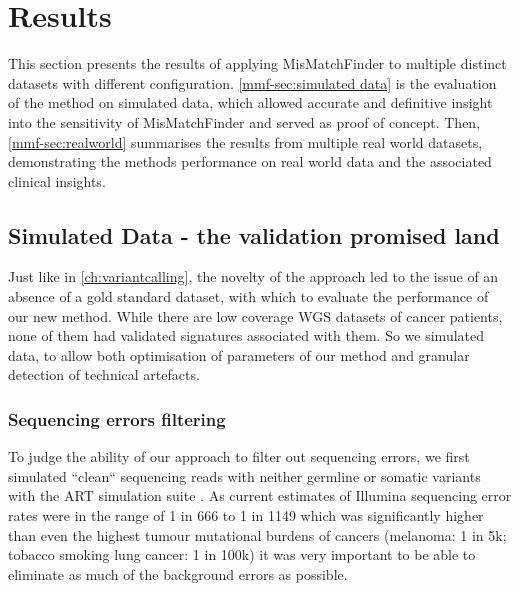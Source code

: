 
\section{Results}
\label{mmf-sec:results}
This section presents the results of applying MisMatchFinder to multiple distinct datasets with different configuration. \autoref{mmf-sec:simulated data} is the evaluation of the method on simulated data, which allowed accurate and definitive insight into the sensitivity of MisMatchFinder and served as proof of concept. Then, \autoref{mmf-sec:realworld} summarises the results from multiple real world datasets, demonstrating the methods performance on real world data and the associated clinical insights.

\subsection{Simulated Data - the validation promised land}
\label{mmf-sec:simulated data}
Just like in \autoref{ch:variantcalling}, the novelty of the approach led to the issue of an absence of a gold standard dataset, with which to evaluate the performance of our new method. While there are low coverage WGS datasets of cancer patients, none of them had validated signatures associated with them. So we simulated data, to allow both optimisation of parameters of our method and granular detection of technical artefacts. 

\subsubsection{Sequencing errors filtering}
\label{mmf-sec:cleanSim}
To judge the ability of our approach to filter out sequencing errors, we first simulated ``clean`` sequencing reads with neither germline or somatic variants with the ART simulation suite \cite{Huang2011}. As current estimates of Illumina sequencing error rates were in the range of 1 in 666 to 1 in 1149 \cite{Stoler2021} which was significantly higher than even the highest tumour mutational burdens of  cancers (melanoma: 1 in 5k; tobacco smoking lung cancer: 1 in 100k) it was very important to be able to eliminate as much of the background errors as possible.

